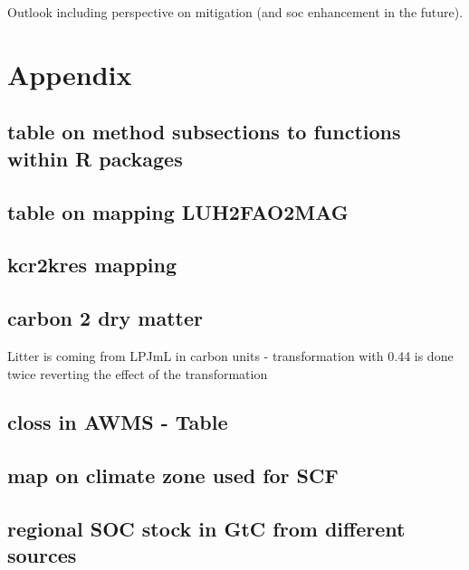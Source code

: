 \documentclass[gc, manuscript]{copernicus}
\begin{document}
\conclusions

Outlook including perspective on mitigation (and soc enhancement in the future).
\newpage

\hypertarget{appendix}{%
\section{Appendix}\label{appendix}}

\hypertarget{append:subsection2mrfunctions}{%
\subsection{table on method subsections to functions within R packages}\label{append:subsection2mrfunctions}}

\hypertarget{append:Tableluh2fao2mag}{%
\subsection{table on mapping LUH2FAO2MAG}\label{append:Tableluh2fao2mag}}

\hypertarget{append:Tablekcr2kres}{%
\subsection{kcr2kres mapping}\label{append:Tablekcr2kres}}

\hypertarget{append:Tablec2dm}{%
\subsection{carbon 2 dry matter}\label{append:Tablec2dm}}

Litter is coming from LPJmL in carbon units - transformation with 0.44 is done twice reverting the effect of the transformation

\hypertarget{append:TableclossAWMS}{%
\subsection{closs in AWMS - Table}\label{append:TableclossAWMS}}

\hypertarget{append:climatemap}{%
\subsection{map on climate zone used for SCF}\label{append:climatemap}}

\hypertarget{append:regcompare}{%
\subsection{regional SOC stock in GtC from different sources}\label{append:regcompare}}
\end{document}
